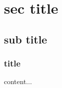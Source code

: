\documentclass{beamer}
\begin{document}
\section{sec title}
\subsection{sub title}
\begin{frame}
\frametitle{title}
content...
\end{frame}
\end{document}
